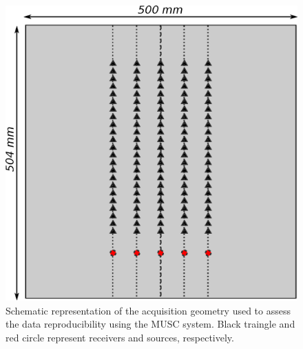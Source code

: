 \documentclass[manuscript,revised]{geophysics}
\begin{document}
%

\begin{figure}[!h]
	\centering
	\includegraphics[scale=0.5]{fig/reproducibility_acqui_principle.eps}
	\caption{Schematic representation of the acquisition geometry used to assess the data reproducibility using the MUSC system. Black traingle and red circle represent receivers and sources, respectively.}
	\label{reproducibility_acqui_principle}
\end{figure}
\end{document}
